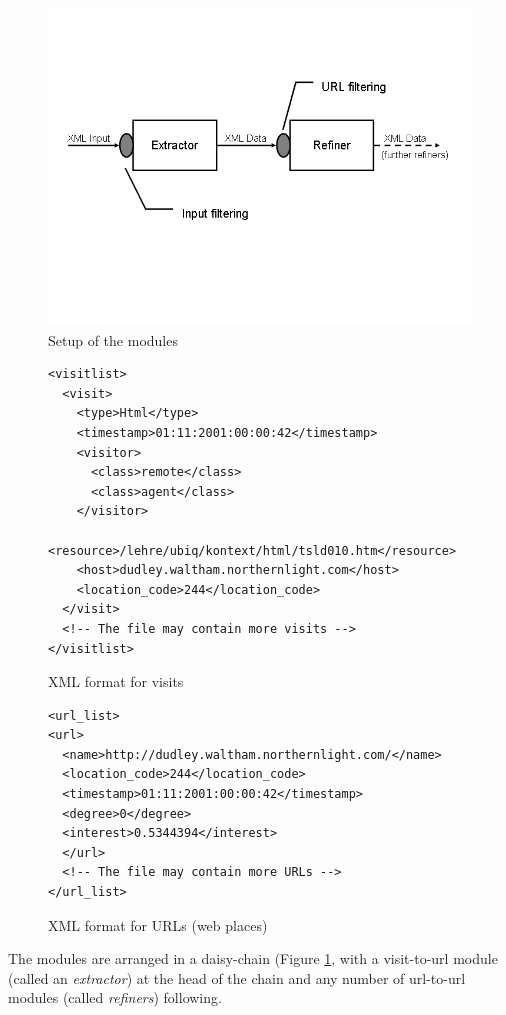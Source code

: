 \documentclass[a4paper]{danarticle}
\theoremstyle{remark}
\begin{document}
      \begin{figure}[ht]
        \centering
        \includegraphics[width=12cm]{gilbert_steps}
        \caption{Setup of the modules}
        \label{gilbert_steps}
      \end{figure}
      \begin{figure}[ht]
\begin{verbatim}
<visitlist>
  <visit>
    <type>Html</type>
    <timestamp>01:11:2001:00:00:42</timestamp>
    <visitor>
      <class>remote</class>
      <class>agent</class>
    </visitor>
    <resource>/lehre/ubiq/kontext/html/tsld010.htm</resource>
    <host>dudley.waltham.northernlight.com</host>
    <location_code>244</location_code>
  </visit>
  <!-- The file may contain more visits -->
</visitlist>
\end{verbatim}
        \caption{XML format for visits}
	\label{visitxml}
      \end{figure}
      \begin{figure}[ht]
\begin{verbatim}
<url_list>
<url>
  <name>http://dudley.waltham.northernlight.com/</name>
  <location_code>244</location_code>
  <timestamp>01:11:2001:00:00:42</timestamp>
  <degree>0</degree>
  <interest>0.5344394</interest>
  </url>
  <!-- The file may contain more URLs -->
</url_list>
\end{verbatim}
        \caption{XML format for URLs (web places)}
	\label{urlxml}
      \end{figure}
      
      The modules are arranged in a daisy-chain (Figure \ref{gilbert_steps}, 
      with a visit-to-url module 
      (called an \textit{extractor}) at the head of the chain and any number of 
      url-to-url modules (called \textit{refiners}) following. 
      
\end{document}
